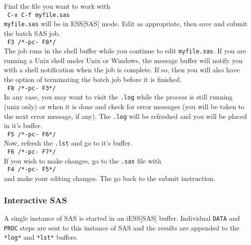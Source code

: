 \documentclass{article}
\newcommand{\elcode}[1]{\\{\texttt{\hspace*{2em} #1}}\\}
\begin{document}
Find the file you want to work with
    \elcode{C-x C-f myfile.sas}
\texttt{myfile.sas} will be in ESS[SAS] mode.
Edit as appropriate, then save and submit the batch SAS job.
    \elcode{F3  /*-pc- F8*/}
The job runs in the shell buffer while you continue to edit 
\texttt{myfile.sas}.  If you are running a Unix shell under Unix or
Windows, the message buffer will notify you with a shell
notification when the job is complete.  If so, then you 
will also have the option of terminating the batch job
before it is finished.
    \elcode{F8  /*-pc- F3*/}
In any case, you may want to visit the \texttt{.log} while the process
is still running (unix only) or when it is done and check for
error messages 
(you will be taken to the next error message, if any).
The \texttt{.log} will be refreshed and you will be placed in it's buffer.
    \elcode{F5  /*-pc- F6*/}
Now, refresh the \texttt{.lst} and go to it's buffer.
    \elcode{F6  /*-pc- F7*/}
If you wish to make changes, go to the \texttt{.sas} file with
    \elcode{F4 /*-pc- F5*/}
and make your editing changes.  The go back to the submit instruction.

\subsubsection{Interactive SAS}
A single instance of SAS is started in an iESS[SAS] buffer.
Individual \texttt{DATA} and \texttt{PROC} steps are sent to this
instance of SAS and the results are appended to the \texttt{*log*}
and \texttt{*lst*} buffers.
\end{document}
